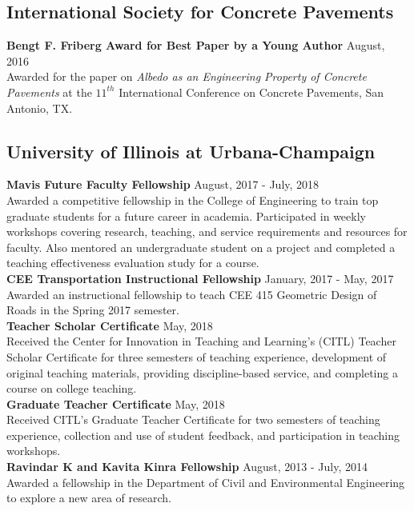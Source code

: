 \documentclass[12pt]{article}
\begin{document}
\subsection*{International Society for Concrete Pavements}
\textbf{Bengt F. Friberg Award for Best Paper by a Young Author} \hfill August, 2016 \\
Awarded for the paper on \textit{Albedo as an Engineering Property of Concrete Pavements} at the $11^{th}$ International Conference on Concrete Pavements, San Antonio, TX. \\

\subsection*{University of Illinois at Urbana-Champaign} 
\textbf{Mavis Future Faculty Fellowship} \hfill August, 2017 - July, 2018 \\
Awarded a competitive fellowship in the College of Engineering to train top graduate students for a future career in academia. Participated in weekly workshops covering research, teaching, and service requirements and resources for faculty. Also mentored an undergraduate student on a project and completed a teaching effectiveness evaluation study for a course.\\

\textbf{CEE Transportation Instructional Fellowship} \hfill January, 2017 - May, 2017 \\
Awarded an instructional fellowship to teach CEE 415 Geometric Design of Roads in the Spring 2017 semester. \\

\textbf{Teacher Scholar Certificate} \hfill May, 2018 \\
Received the Center for Innovation in Teaching and Learning's (CITL) Teacher Scholar Certificate for three semesters of teaching experience, development of original teaching materials, providing discipline-based service, and completing a course on college teaching. \\

\textbf{Graduate Teacher Certificate} \hfill May, 2018 \\
Received CITL's Graduate Teacher Certificate for two semesters of teaching experience, collection and use of student feedback, and participation in teaching workshops. \\

\textbf{Ravindar K and Kavita Kinra Fellowship} \hfill August, 2013 - July, 2014 \\
Awarded a fellowship in the Department of Civil and Environmental Engineering to explore a new area of research. \\
\end{document}
